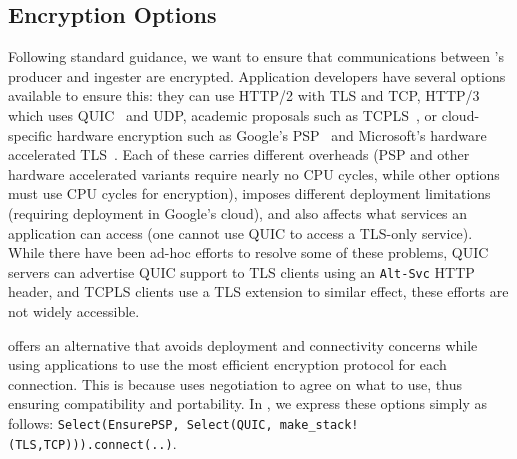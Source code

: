\subsection{Encryption Options}\label{s:app:quic}
Following standard guidance, we want to ensure that communications between \etlapp's producer and ingester are encrypted. Application developers have several options available to ensure this: they can use HTTP/2 with TLS and TCP, HTTP/3~\cite{http3-rfc} which uses QUIC~\cite{quic} and UDP, academic proposals such as TCPLS~\cite{tcpls}, or cloud-specific hardware encryption such as Google's PSP~\cite{psp} and Microsoft's hardware accelerated TLS~\cite{microsoft-encryption}. Each of these carries different overheads (\eg PSP and other hardware accelerated variants require nearly no CPU cycles, while other options must use CPU cycles for encryption), imposes different deployment limitations (\eg requiring deployment in Google's cloud), and also affects what services an application can access (one cannot use QUIC to access a TLS-only service). While there have been ad-hoc efforts to resolve some of these problems, \eg  QUIC servers can advertise QUIC support to TLS clients using an \texttt{Alt-Svc} HTTP header, and TCPLS clients use a TLS extension to similar effect, these efforts 
are not widely accessible.


\name offers an alternative that avoids deployment and connectivity concerns while using applications to use the most efficient encryption protocol for each connection. This is because \name uses negotiation to agree on what \tunnel to use, thus ensuring compatibility and portability.
In \etlapp, we express these options simply as follows: \texttt{Select(EnsurePSP, Select(QUIC, make\_stack!(TLS,TCP))).connect(..)}.


